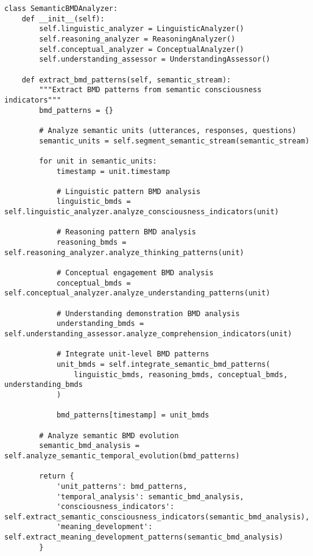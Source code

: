 \documentclass[12pt,a4paper]{article}
\begin{document}
\begin{lstlisting}[style=pythonstyle, caption=Semantic BMD Pattern Recognition]
class SemanticBMDAnalyzer:
    def __init__(self):
        self.linguistic_analyzer = LinguisticAnalyzer()
        self.reasoning_analyzer = ReasoningAnalyzer()
        self.conceptual_analyzer = ConceptualAnalyzer()
        self.understanding_assessor = UnderstandingAssessor()
        
    def extract_bmd_patterns(self, semantic_stream):
        """Extract BMD patterns from semantic consciousness indicators"""
        bmd_patterns = {}
        
        # Analyze semantic units (utterances, responses, questions)
        semantic_units = self.segment_semantic_stream(semantic_stream)
        
        for unit in semantic_units:
            timestamp = unit.timestamp
            
            # Linguistic pattern BMD analysis
            linguistic_bmds = self.linguistic_analyzer.analyze_consciousness_indicators(unit)
            
            # Reasoning pattern BMD analysis
            reasoning_bmds = self.reasoning_analyzer.analyze_thinking_patterns(unit)
            
            # Conceptual engagement BMD analysis
            conceptual_bmds = self.conceptual_analyzer.analyze_understanding_patterns(unit)
            
            # Understanding demonstration BMD analysis
            understanding_bmds = self.understanding_assessor.analyze_comprehension_indicators(unit)
            
            # Integrate unit-level BMD patterns
            unit_bmds = self.integrate_semantic_bmd_patterns(
                linguistic_bmds, reasoning_bmds, conceptual_bmds, understanding_bmds
            )
            
            bmd_patterns[timestamp] = unit_bmds
        
        # Analyze semantic BMD evolution
        semantic_bmd_analysis = self.analyze_semantic_temporal_evolution(bmd_patterns)
        
        return {
            'unit_patterns': bmd_patterns,
            'temporal_analysis': semantic_bmd_analysis,
            'consciousness_indicators': self.extract_semantic_consciousness_indicators(semantic_bmd_analysis),
            'meaning_development': self.extract_meaning_development_patterns(semantic_bmd_analysis)
        }
    

\end{lstlisting}
\end{document}
